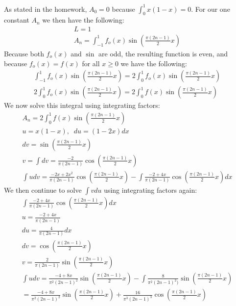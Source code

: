 \documentclass{article}
\begin{document}
As stated in the homework, $A_0 = 0$ because $\int_0^1 x(1-x) = 0$. For our one constant $A_n$ we then have the following:
\begin{equation}
\begin{aligned}
L = 1\\
A_n = \int_{-1}^1 f_o(x)\sin(\frac{\pi(2n-1)}{2}x)
\end{aligned}
\end{equation}
Because both $f_o(x)$ and $\sin$ are odd, the resulting function is even, and because $f_o(x) = f(x)$ for all $x \geq 0$ we have the following:
\begin{equation}
\begin{aligned}
\int_{-1}^1 f_o(x)\sin(\frac{\pi(2n-1)}{2}x) = 2\int_0^1 f_o(x)\sin(\frac{\pi(2n-1)}{2}x)\\
2\int_0^1 f_o(x)\sin(\frac{\pi(2n-1)}{2}x) = 2\int_0^1 f(x)\sin(\frac{\pi(2n-1)}{2}x)\end{aligned}
\end{equation}
We now solve this integral using integrating factors:
\begin{equation}
\begin{aligned}
A_n = 2\int_0^1 f(x)\sin(\frac{\pi(2n-1)}{2}x)\\
u = x(1-x), \; \; du = (1-2x)dx\\
dv = \sin(\frac{\pi(2n-1)}{2}x)\\
v = \int dv = \frac{-2}{\pi(2n-1)}\cos(\frac{\pi(2n-1)}{2}x)\\
\int udv = \frac{-2x + 2x^2}{\pi(2n-1)}\cos(\frac{\pi(2n-1)}{2}x) - \int \frac{-2 + 4x}{\pi(2n-1)}\cos(\frac{\pi(2n-1)}{2}x)dx
\end{aligned}
\end{equation}
We then continue to solve $\int vdu$ using integrating factors again:
\begin{equation}
\begin{aligned}
\int \frac{-2 + 4x}{\pi(2n-1)}\cos(\frac{\pi(2n-1)}{2}x)dx\\
u = \frac{-2 + 4x}{\pi(2n-1)}\\
du = \frac{4}{\pi(2n-1)}dx\\
dv = \cos(\frac{\pi(2n-1)}{2}x)\\
v = \frac{2}{\pi(2n-1)}\sin(\frac{\pi(2n-1)}{2}x)\\
\int udv = \frac{-4 + 8x}{\pi^2(2n-1)^2}\sin(\frac{\pi(2n-1)}{2}x) - \int \frac{8}{\pi^2(2n-1)^2)}\sin(\frac{\pi(2n-1)}{2}x)\\
= \frac{-4 + 8x}{\pi^2(2n-1)^2}\sin(\frac{\pi(2n-1)}{2}x) + \frac{16}{\pi^3(2n-1)^3}\cos(\frac{\pi(2n-1)}{2}x)
\end{aligned}
\end{equation}
\end{document}
